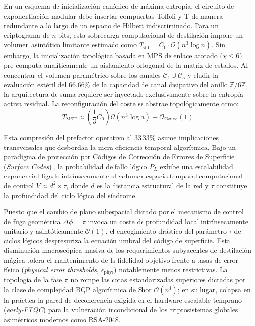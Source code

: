 \documentclass[12pt,a4paper]{article}
\theoremstyle{plain}
\theoremstyle{definition}
\theoremstyle{remark}
\begin{document}
En un esquema de inicialización canónico de máxima entropía, el circuito de exponentiación modular debe insertar compuertas Toffoli y T de manera redundante a lo largo de un espacio de Hilbert indiscriminado. Para un criptograma de $n$ bits, esta sobrecarga computacional de destilación impone un volumen asintótico limitante estimado como $T_{\text{std}} = C_0 \cdot \mathcal{O}(n^3 \log n)$. Sin embargo, la inicialización topológica basada en MPS de enlace acotado ($\chi \le 6$) pre-computa analíticamente un aislamiento ortogonal de la matriz de estados. Al concentrar el volumen paramétrico sobre los canales $\mathcal{C}_1 \cup \mathcal{C}_5$ y eludir la evaluación estéril del $66.66\%$ de la capacidad de canal disipativo del anillo $\mathbb{Z}/6\mathbb{Z}$, la arquitectura de suma requiere ser inyectada exclusivamente sobre la entropía activa residual. La reconfiguración del coste se abstrae topológicamente como:
\begin{equation}
T_{\text{MST}} \approx \left(\frac{1}{3} C_0 \right) \mathcal{O}(n^3 \log n) + \mathcal{O}_{\text{Gauge}}(1)
\label{eq:toffoli_reduction}
\end{equation}

Esta compresión del prefactor operativo al $33.33\%$ asume implicaciones transversales que desbordan la mera eficiencia temporal algorítmica. Bajo un paradigma de protección por Códigos de Corrección de Errores de Superficie (\textit{Surface Codes}) \cite{Fowler2012}, la probabilidad de fallo lógico $P_L$ exhibe una escalabilidad exponencial ligada intrínsecamente al volumen espacio-temporal computacional de control $V \approx d^2 \times \tau$, donde $d$ es la distancia estructural de la red y $\tau$ constituye la profundidad del ciclo lógico del síndrome.

Puesto que el cambio de plano subespacial dictado por el mecanismo de control de fuga geométrica $\Delta\phi = \pi$ invoca un coste de profundidad local intrínsecamente unitario y asintóticamente $\mathcal{O}(1)$, el encogimiento drástico del parámetro $\tau$ de ciclos lógicos despresuriza la ecuación umbral del código de superficie. Esta disminución macroscópica masiva de los requerimientos subyacentes de destilación mágica tolera el mantenimiento de la fidelidad objetivo frente a tasas de error físico (\textit{physical error thresholds}, $\epsilon_{\text{phys}}$) notablemente menos restrictivas. La topología de la fase $\pi$ no rompe las cotas estandarizadas superiores dictadas por la clase de complejidad BQP algorítmica de Shor $\mathcal{O}(n^3)$; en su lugar, colapsa en la práctica la pared de decoherencia exigida en el hardware escalable temprano (\textit{early-FTQC}) para la vulneración incondicional de los criptosistemas globales asimétricos modernos como RSA-2048.
\end{document}

